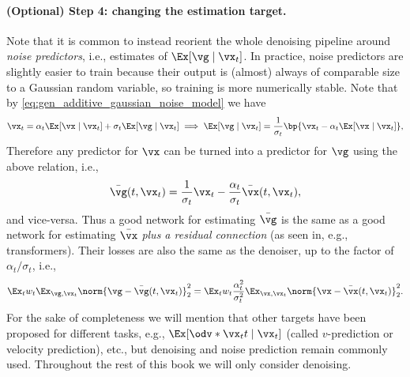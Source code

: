 \documentclass[../../book-main.tex]{subfiles}
\begin{document}
\paragraph{(Optional) Step 4: changing the estimation target.} Note that it is common to instead reorient the whole denoising pipeline around \textit{noise predictors}, i.e., estimates of \(\Ex[\vg \mid \vx_{t}]\). In practice, noise predictors are slightly easier to train because their output is (almost) always of comparable size to a Gaussian random variable, so training is more numerically stable. Note that by \eqref{eq:gen_additive_gaussian_noise_model} we have 
\begin{equation}
	\vx_{t} = \alpha_{t}\Ex[\vx \mid \vx_{t}] + \sigma_{t}\Ex[\vg \mid \vx_{t}] \implies \Ex[\vg \mid \vx_{t}] = \frac{1}{\sigma_{t}}\bp{\vx_{t} - \alpha_{t}\Ex[\vx \mid \vx_{t}]},
\end{equation}
Therefore any predictor for \(\vx\) can be turned into a predictor for \(\vg\) using the above relation, i.e.,
\begin{equation}
	\bar{\vg}(t, \vx_{t}) = \frac{1}{\sigma_{t}}\vx_{t} - \frac{\alpha_{t}}{\sigma_{t}}\bar{\vx}(t, \vx_{t}),
\end{equation}
and vice-versa. Thus a good network for estimating \(\bar{\vg}\) is the same as a good network for estimating \(\bar{\vx}\) \textit{plus a residual connection} (as seen in, e.g., transformers). Their losses are also the same as the denoiser, up to the factor of \(\alpha_{t}/\sigma_{t}\), i.e.,
\begin{equation}
	\Ex_{t}w_{t}\Ex_{\vg, \vx_{t}}\norm{\vg - \bar{\vg}(t, \vx_{t})}_{2}^{2} = \Ex_{t}w_{t}\frac{\alpha_{t}^{2}}{\sigma_{t}^{2}}\Ex_{\vx, \vx_{t}}\norm{\vx - \bar{\vx}(t, \vx_{t})}_{2}^{2}.
\end{equation}
For the sake of completeness we will mention that other targets have been proposed for different tasks, e.g., \(\Ex[\odv*{\vx_{t}}{t} \mid \vx_{t}]\) (called \(v\)-prediction or velocity prediction), etc., but denoising and noise prediction remain commonly used. Throughout the rest of this book we will only consider denoising.
\end{document}

